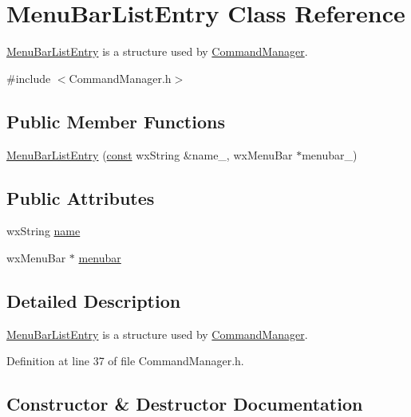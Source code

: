 \hypertarget{struct_menu_bar_list_entry}{}\section{Menu\+Bar\+List\+Entry Class Reference}
\label{struct_menu_bar_list_entry}


\hyperlink{struct_menu_bar_list_entry}{Menu\+Bar\+List\+Entry} is a structure used by \hyperlink{class_command_manager}{Command\+Manager}.  




{\ttfamily \#include $<$Command\+Manager.\+h$>$}

\subsection*{Public Member Functions}
\begin{DoxyCompactItemize}
\item 
\hyperlink{struct_menu_bar_list_entry_a79363d1a70ff7da196b7e1e7ea0d1224}{Menu\+Bar\+List\+Entry} (\hyperlink{getopt1_8c_a2c212835823e3c54a8ab6d95c652660e}{const} wx\+String \&name\+\_\+, wx\+Menu\+Bar $\ast$menubar\+\_\+)
\end{DoxyCompactItemize}
\subsection*{Public Attributes}
\begin{DoxyCompactItemize}
\item 
wx\+String \hyperlink{struct_menu_bar_list_entry_ac1bc02353b4dacc5bd66931bdaa43c7b}{name}
\item 
wx\+Menu\+Bar $\ast$ \hyperlink{struct_menu_bar_list_entry_a66091dde001e2ae91484d86a6cf022cb}{menubar}
\end{DoxyCompactItemize}


\subsection{Detailed Description}
\hyperlink{struct_menu_bar_list_entry}{Menu\+Bar\+List\+Entry} is a structure used by \hyperlink{class_command_manager}{Command\+Manager}. 

Definition at line 37 of file Command\+Manager.\+h.



\subsection{Constructor \& Destructor Documentation}
